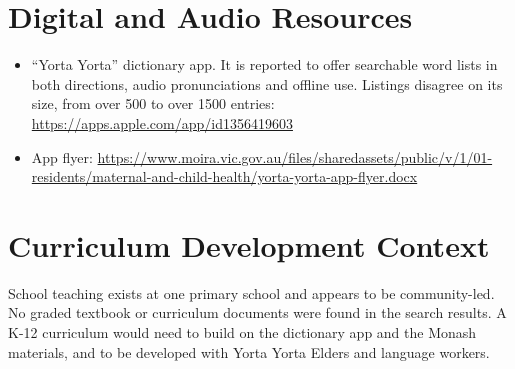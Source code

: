 \documentclass[12pt]{article}
\begin{document}
\section{Digital and Audio Resources}
\begin{itemize}
\item ``Yorta Yorta'' dictionary app. It is reported to offer searchable word lists in both directions, audio pronunciations and offline use. Listings disagree on its size, from over 500 to over 1500 entries: \url{https://apps.apple.com/app/id1356419603}
\item App flyer: \url{https://www.moira.vic.gov.au/files/sharedassets/public/v/1/01-residents/maternal-and-child-health/yorta-yorta-app-flyer.docx}
\end{itemize}

\section{Curriculum Development Context}
School teaching exists at one primary school and appears to be community-led. No graded textbook or curriculum documents were found in the search results. A K-12 curriculum would need to build on the dictionary app and the Monash materials, and to be developed with Yorta Yorta Elders and language workers.
\end{document}
